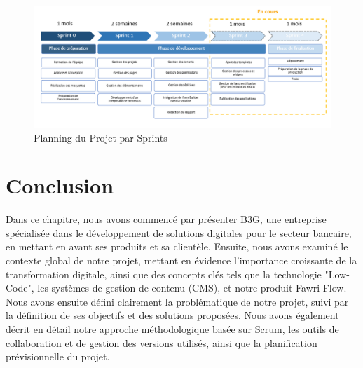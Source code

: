 \begin{figure}[H]
    \centering
    \includegraphics[width=18cm]{Figures/sprints.PNG}
    \caption{Planning du Projet par Sprints}
\end{figure}



\newpage

\section*{Conclusion}

\hspace{\parindent}Dans ce chapitre, nous avons commencé par présenter B3G, une entreprise spécialisée dans le développement de solutions digitales pour le secteur bancaire, en mettant en avant ses produits et sa clientèle. Ensuite, nous avons examiné le contexte global de notre projet, mettant en évidence l'importance croissante de la transformation digitale, ainsi que des concepts clés tels que la technologie "Low-Code", les systèmes de gestion de contenu (CMS), et notre produit Fawri-Flow. Nous avons ensuite défini clairement la problématique de notre projet, suivi par la définition de ses objectifs et des solutions proposées. Nous avons également décrit en détail notre approche méthodologique basée sur Scrum, les outils de collaboration et de gestion des versions utilisés, ainsi que la planification prévisionnelle du projet.

